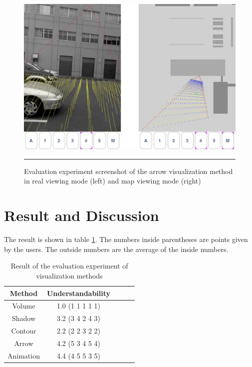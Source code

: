 \begin{figure}[htbp]
	\centering
	\includegraphics[width=14cm]{./Primitives/experiment_screenshot.png}
	\rule{35em}{0.5pt}
	\caption[Evaluation experiment screenshot]{Evaluation experiment screenshot of the arrow visualization method in real viewing mode (left) and map viewing mode (right)}
	\label{fig:ExperimentScreenshot}
\end{figure}


\section{Result and Discussion}

The result is shown in table \ref{tb:ExperimentResult}. The numbers inside parentheses are points given by the users. The outside numbers are the average of the inside numbers.

\begin{table}[tb]
	\begin{center}
		\caption{Result of the evaluation experiment of visualization methods}
		\label{tb:ExperimentResult}
		\begin{tabular}{|c|c|c|c|c|}
			\hline
			Method    & Understandability \\
			\hline
			Volume    & 1.0 (1 1 1 1 1) \\
			Shadow    & 3.2 (3 4 2 4 3) \\
			Contour   & 2.2 (2 2 3 2 2) \\
			Arrow     & 4.2 (5 3 4 5 4) \\
			Animation & 4.4 (4 5 5 3 5) \\
			\hline
		\end{tabular}
	\end{center}
\end{table}

